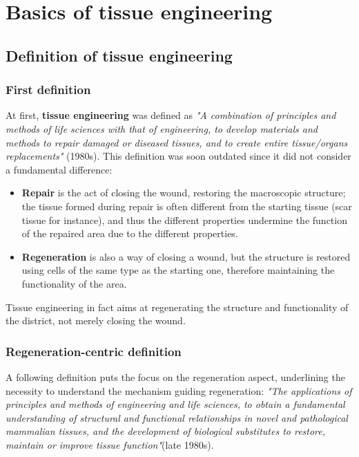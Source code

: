 \chapter{Basics of tissue engineering}

\section{Definition of tissue engineering}

  \subsection{First definition}
  At first, \textbf{tissue engineering} was defined as \textit{"A combination of principles and methods of life sciences with that of engineering, to develop materials and methods to repair damaged or diseased tissues, and to create entire tissue/organs replacements"} (1980s).
  This definition was soon outdated since it did not consider a fundamental difference:

  \begin{multicols}{2}
    \begin{itemize}
      \item \textbf{Repair} is the act of closing the wound, restoring the macroscopic structure; the tissue  formed during repair is often different from the starting tissue (scar tissue for instance), and thus the different properties undermine the function of the repaired area due to the different properties.
      \item \textbf{Regeneration} is also a way of closing a wound, but the structure is restored using cells of the same type as the starting one, therefore maintaining the functionality of the area.
    \end{itemize}
  \end{multicols}

  Tissue engineering in fact aims at regenerating the structure and functionality of the district, not merely closing the wound.

  \subsection{Regeneration-centric definition}
  A following definition puts the focus on the regeneration aspect, underlining the necessity to understand the mechanism guiding regeneration: \textit{"The applications of principles and methods of engineering and life sciences, to obtain a fundamental understanding of structural and functional relationships in novel and pathological mammalian tissues, and the development of biological substitutes to restore, maintain or improve tissue function"}(late 1980s).

